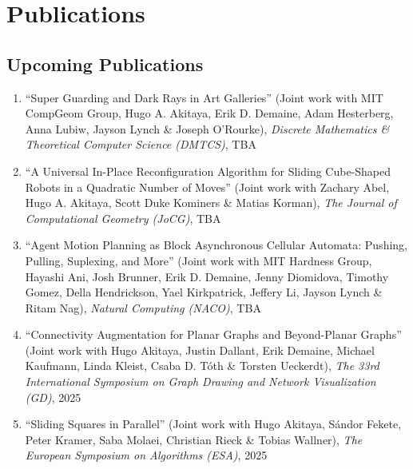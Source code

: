 \documentclass[letterpaper,11pt]{article}
\makeatletter
\newcommand{\resumeSubHeadingListStart}{\begin{itemize}[leftmargin=*]}
\newcommand{\resumeSubHeadingListEnd}{\end{itemize}}
\newcommand{\publication}[6]{
  \item ``#1'' %
   (Joint work with#2), %
     \emph{#3}, %
      #4%


}
\newcommand{\pdficon}{\faFilePdf}
\makeatother
\begin{document}
\section{Publications}


    \subsection*{Upcoming Publications}%
  
    \begin{enumerate}
    \setcounter{enumi}{\value{pubnum}}
      
        \publication
          {Super Guarding and Dark Rays in Art Galleries}
          {
 MIT CompGeom Group, Hugo A. Akitaya, Erik D. Demaine, Adam Hesterberg, Anna Lubiw, Jayson Lynch \& Joseph O'Rourke}
          {Discrete Mathematics \& Theoretical Computer Science (DMTCS)}
          {TBA}
          {%
%
%
%
          }
          {1}
 \vspace{-.5em}  
      
        \publication
          {A Universal In-Place Reconfiguration Algorithm for Sliding Cube-Shaped Robots in a Quadratic Number of Moves}
          {
 Zachary Abel, Hugo A. Akitaya, Scott Duke Kominers \& Matias Korman}
          {The Journal of Computational Geometry (JoCG)}
          {TBA}
          {%
%
%
%
          }
          {2}
 \vspace{-.5em}  
      
        \publication
          {Agent Motion Planning as Block Asynchronous Cellular Automata: Pushing, Pulling, Suplexing, and More}
          {
 MIT Hardness Group, Hayashi Ani, Josh Brunner, Erik D. Demaine, Jenny Diomidova, Timothy Gomez, Della Hendrickson, Yael Kirkpatrick, Jeffery Li, Jayson Lynch \& Ritam Nag}
          {Natural Computing (NACO)}
          {TBA}
          {%
\href{tba/docstore/Push-Pull-NACO.pdf}{\pdficon}%
%
%
          }
          {3}
 \vspace{-.5em}  
      
        \publication
          {Connectivity Augmentation for Planar Graphs and Beyond-Planar Graphs}
          {
 Hugo Akitaya, Justin Dallant, Erik Demaine, Michael Kaufmann, Linda Kleist, Csaba D. Tóth \& Torsten Ueckerdt}
          {The 33rd International Symposium on Graph Drawing and Network Visualization (GD)}
          {2025}
          {%
%
%
%
          }
          {4}
 \vspace{-.5em}  
      
        \publication
          {Sliding Squares in Parallel}
          {
 Hugo Akitaya, Sándor Fekete, Peter Kramer, Saba Molaei, Christian Rieck \& Tobias Wallner}
          {The European Symposium on Algorithms (ESA)}
          {2025}
          {%
%
%
%
          }
          {5}
 
    \setcounter{pubnum}{\value{enumi}}
    \end{enumerate}
\end{document}
